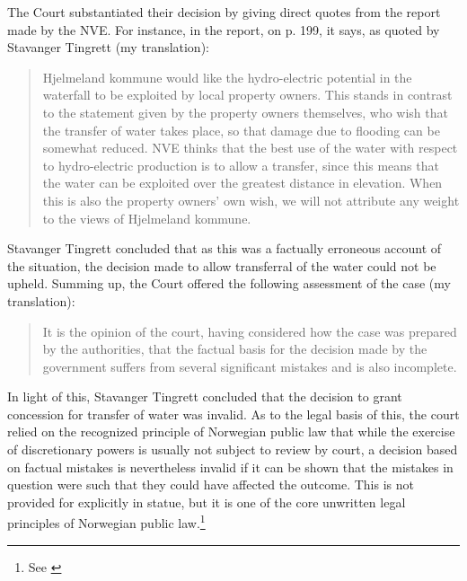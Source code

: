 The Court substantiated their decision by giving direct quotes from the report made by the NVE. For instance, in the report, on p. 199, it says, as quoted by Stavanger Tingrett (my translation):
\begin{quote}
Hjelmeland kommune would like the hydro-electric potential in the waterfall to be exploited by 
local property owners. This stands in contrast to the statement given by the property owners 
themselves, who wish that the transfer of water takes place, so that damage due to flooding can be 
somewhat reduced. NVE thinks that the best use of the water with respect to hydro-electric 
production is to allow a transfer, since this means that the water can be exploited over the greatest
distance in elevation. When this is also the property owners' own wish, we will not attribute any 
weight to the views of Hjelmeland kommune.
\end{quote}

Stavanger Tingrett concluded that as this was a factually erroneous account of the situation, the decision made to allow transferral of the water could not be upheld. Summing up, the Court offered the following assessment of the case (my translation):

\begin{quote}
It is the opinion of the court, having considered how the case was prepared by the authorities, that the factual basis for the decision made by the government suffers from several significant mistakes and is also incomplete.
\end{quote}

In light of this, Stavanger Tingrett concluded that the decision to grant concession for transfer of water was invalid. As to the legal basis of this, the court relied on the recognized principle of Norwegian public law that while the exercise of discretionary powers is usually not subject to review by court, a decision based on factual mistakes is nevertheless invalid if it can be shown that the mistakes in question were such that they could have affected the outcome. This is not provided for explicitly in statue, but it is one of the core unwritten legal principles of Norwegian public law.\footnote{See \cite{Efvl}}

